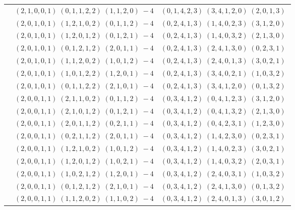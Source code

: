 \documentclass[11pt]{article}
\begin{document}
\begin{longtable}[l]{|c|c|c|}
 \cline{2-3} 
 & $(2 ,1 ,0 ,0 ,1) \;(0 ,1 ,1 ,2 ,2) \;(1 ,1 ,2 ,0) \;-4$ & $(0 ,1 ,4 ,2 ,3) \;(3 ,4 ,1 ,2 ,0) \;(2 ,0 ,1 ,3) \;$\\ 
 \cline{2-3} 
 & $(2 ,0 ,1 ,0 ,1) \;(1 ,2 ,1 ,0 ,2) \;(0 ,1 ,1 ,2) \;-4$ & $(0 ,2 ,4 ,1 ,3) \;(1 ,4 ,0 ,2 ,3) \;(3 ,1 ,2 ,0) \;$\\ 
 \cline{2-3} 
 & $(2 ,0 ,1 ,0 ,1) \;(1 ,2 ,0 ,1 ,2) \;(0 ,1 ,2 ,1) \;-4$ & $(0 ,2 ,4 ,1 ,3) \;(1 ,4 ,0 ,3 ,2) \;(2 ,1 ,3 ,0) \;$\\ 
 \cline{2-3} 
 & $(2 ,0 ,1 ,0 ,1) \;(0 ,1 ,2 ,1 ,2) \;(2 ,0 ,1 ,1) \;-4$ & $(0 ,2 ,4 ,1 ,3) \;(2 ,4 ,1 ,3 ,0) \;(0 ,2 ,3 ,1) \;$\\ 
 \cline{2-3} 
 & $(2 ,0 ,1 ,0 ,1) \;(1 ,1 ,2 ,0 ,2) \;(1 ,0 ,1 ,2) \;-4$ & $(0 ,2 ,4 ,1 ,3) \;(2 ,4 ,0 ,1 ,3) \;(3 ,0 ,2 ,1) \;$\\ 
 \cline{2-3} 
 & $(2 ,0 ,1 ,0 ,1) \;(1 ,0 ,1 ,2 ,2) \;(1 ,2 ,0 ,1) \;-4$ & $(0 ,2 ,4 ,1 ,3) \;(3 ,4 ,0 ,2 ,1) \;(1 ,0 ,3 ,2) \;$\\ 
 \cline{2-3} 
 & $(2 ,0 ,1 ,0 ,1) \;(0 ,1 ,1 ,2 ,2) \;(2 ,1 ,0 ,1) \;-4$ & $(0 ,2 ,4 ,1 ,3) \;(3 ,4 ,1 ,2 ,0) \;(0 ,1 ,3 ,2) \;$\\ 
 \cline{2-3} 
 & $(2 ,0 ,0 ,1 ,1) \;(2 ,1 ,1 ,0 ,2) \;(0 ,1 ,1 ,2) \;-4$ & $(0 ,3 ,4 ,1 ,2) \;(0 ,4 ,1 ,2 ,3) \;(3 ,1 ,2 ,0) \;$\\ 
 \cline{2-3} 
 & $(2 ,0 ,0 ,1 ,1) \;(2 ,1 ,0 ,1 ,2) \;(0 ,1 ,2 ,1) \;-4$ & $(0 ,3 ,4 ,1 ,2) \;(0 ,4 ,1 ,3 ,2) \;(2 ,1 ,3 ,0) \;$\\ 
 \cline{2-3} 
 & $(2 ,0 ,0 ,1 ,1) \;(2 ,0 ,1 ,1 ,2) \;(0 ,2 ,1 ,1) \;-4$ & $(0 ,3 ,4 ,1 ,2) \;(0 ,4 ,2 ,3 ,1) \;(1 ,2 ,3 ,0) \;$\\ 
 \cline{2-3} 
 & $(2 ,0 ,0 ,1 ,1) \;(0 ,2 ,1 ,1 ,2) \;(2 ,0 ,1 ,1) \;-4$ & $(0 ,3 ,4 ,1 ,2) \;(1 ,4 ,2 ,3 ,0) \;(0 ,2 ,3 ,1) \;$\\ 
 \cline{2-3} 
 & $(2 ,0 ,0 ,1 ,1) \;(1 ,2 ,1 ,0 ,2) \;(1 ,0 ,1 ,2) \;-4$ & $(0 ,3 ,4 ,1 ,2) \;(1 ,4 ,0 ,2 ,3) \;(3 ,0 ,2 ,1) \;$\\ 
 \cline{2-3} 
 & $(2 ,0 ,0 ,1 ,1) \;(1 ,2 ,0 ,1 ,2) \;(1 ,0 ,2 ,1) \;-4$ & $(0 ,3 ,4 ,1 ,2) \;(1 ,4 ,0 ,3 ,2) \;(2 ,0 ,3 ,1) \;$\\ 
 \cline{2-3} 
 & $(2 ,0 ,0 ,1 ,1) \;(1 ,0 ,2 ,1 ,2) \;(1 ,2 ,0 ,1) \;-4$ & $(0 ,3 ,4 ,1 ,2) \;(2 ,4 ,0 ,3 ,1) \;(1 ,0 ,3 ,2) \;$\\ 
 \cline{2-3} 
 & $(2 ,0 ,0 ,1 ,1) \;(0 ,1 ,2 ,1 ,2) \;(2 ,1 ,0 ,1) \;-4$ & $(0 ,3 ,4 ,1 ,2) \;(2 ,4 ,1 ,3 ,0) \;(0 ,1 ,3 ,2) \;$\\ 
 \cline{2-3} 
 & $(2 ,0 ,0 ,1 ,1) \;(1 ,1 ,2 ,0 ,2) \;(1 ,1 ,0 ,2) \;-4$ & $(0 ,3 ,4 ,1 ,2) \;(2 ,4 ,0 ,1 ,3) \;(3 ,0 ,1 ,2) \;$\\ 

\end{longtable}
\end{document}

